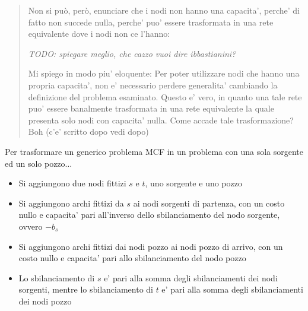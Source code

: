 \begin{quote}
  Non si può, però, enunciare che i nodi non hanno una capacita', perche' di fatto non succede nulla, perche' puo' essere trasformata in una rete equivalente dove i nodi non ce l'hanno:

  \hfill \textit{TODO: spiegare meglio, che cazzo vuoi dire ibbastianini?}

  Mi spiego in modo piu' eloquente: Per poter utilizzare nodi che hanno una propria capacita', non e' necessario perdere generalita' cambiando la definizione del problema esaminato. Questo e' vero, in quanto una tale rete puo' essere banalmente trasformata in una rete equivalente la quale presenta solo nodi con capacita' nulla. Come accade tale trasformazione? Boh (c'e' scritto dopo vedi dopo)
\end{quote}

Per trasformare un generico problema MCF in un problema con una sola sorgente ed un solo pozzo$ \dots $
\begin{itemize}
  \item Si aggiungono due nodi fittizi $s$ e $t$, uno sorgente e uno pozzo
  \item Si aggiungono archi fittizi  da $s$ ai nodi sorgenti di partenza, con un costo nullo e capacita' pari all'inverso dello sbilanciamento del nodo sorgente, ovvero $-b_s$
  \item Si aggiungono archi fittizi dai nodi pozzo ai nodi pozzo di arrivo, con un costo nullo e capacita' pari allo sbilanciamento del nodo pozzo
  \item Lo sbilanciamento di $s$ e' pari alla somma degli sbilanciamenti dei nodi sorgenti, mentre lo sbilanciamento di $t$ e' pari alla somma degli sbilanciamenti dei nodi pozzo
\end{itemize}

